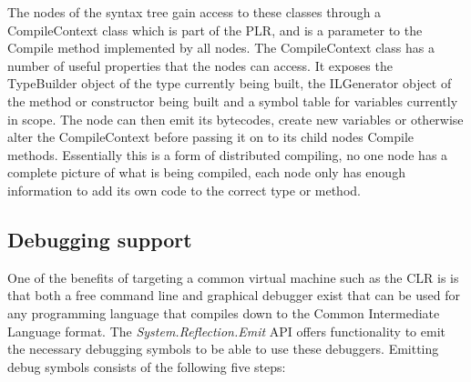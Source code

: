 	The nodes of the syntax tree gain access to these classes through a 
	\textsf{CompileContext} class which is part of the PLR, and is a parameter 
	to the \textsf{Compile} method implemented by all nodes. The 
	\textsf{CompileContext} class has a number of useful properties that the 
	nodes can access. It exposes the \textsf{TypeBuilder} object of the type 
	currently being built, the \textsf{ILGenerator} object of the method or 
	constructor being built and a symbol table for variables currently in scope. 
	The node can then emit its bytecodes, create new variables or otherwise 
	alter the \textsf{CompileContext} before passing it on to its child nodes 
	\textsf{Compile} methods. Essentially this is a form of distributed 
	compiling, no one node has a complete picture of what is being compiled, 
	each node only has enough information to add its own code to the correct 
	type or method.

\subsection{Debugging support}
	
	One of the benefits of targeting a common virtual machine such as the CLR is
	is that both a free command line and graphical debugger exist that can be 
	used for any programming language that compiles down to the Common 
	Intermediate Language format. The \textit{System.Reflection.Emit} API offers 
	functionality to emit the necessary debugging symbols to be able to use 
	these debuggers. Emitting debug symbols consists of the following five steps:
 	
